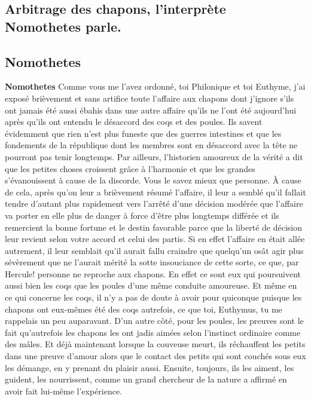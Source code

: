 \documentclass[12pt]{book}
\begin{document}
\begin{pages}
        \begin{Rightside}
        \beginnumbering
            \pstart\section*{Arbitrage des chapons, l'interprète Nomothetes parle.}\pend\pstart\subsection*{Nomothetes}\pend\pstart\textbf{Nomothetes}\hspace{1cm} 
                        Comme vous me l’avez ordonné, toi Philonique et toi Euthyme, j’ai exposé brièvement et sans artifice toute l’affaire aux chapons dont j’ignore s’ils ont jamais été aussi ébahis dans une autre affaire qu’ils ne l’ont été aujourd’hui après qu’ils ont entendu le désaccord des coqs et des poules.
                        Ils savent évidemment que rien n’est plus funeste que des guerres intestines et que les fondements de la république dont les membres sont en désaccord avec la tête ne pourront pas tenir longtemps. Par ailleurs, l’historien amoureux de la vérité a dit que les petites choses croissent grâce à l’harmonie et que les grandes s’évanouissent à cause de la discorde. Vous le savez mieux que personne. 
                        À cause de cela, après qu’on leur a brièvement résumé l’affaire, il leur a semblé qu’il fallait tendre d’autant plus rapidement vers l’arrêté d’une décision modérée que l’affaire va porter en elle plus de danger à force d’être plus longtemps différée et ils remercient la bonne fortune et le destin favorable parce que la liberté de décision leur revient selon votre accord et celui des partis. 
                        Si en effet l’affaire en était allée autrement, il leur semblait qu’il aurait fallu craindre que quelqu’un osât agir plus sévèrement que ne l’aurait mérité la sotte insouciance de cette sorte, ce que, par Hercule! personne ne reproche aux chapons.
                        En effet ce sont eux qui poursuivent aussi bien les coqs que les poules d’une même conduite amoureuse. Et même en ce qui concerne les coqs, il n’y a pas de doute à avoir pour quiconque puisque les chapons ont eux-mêmes été des coqs autrefois, ce que toi, Euthymus, tu me rappelais un peu auparavant. D’un autre côté, pour les poules, les preuves sont le fait qu’autrefois les chapons les ont jadis aimées selon l’instinct ordinaire comme des mâles.
                        Et déjà maintenant lorsque la couveuse meurt, ils réchauffent les petits dans une preuve d’amour alors que le contact des petits qui sont couchés sous eux les démange, en y prenant du plaisir aussi. Ensuite, toujours, ils les aiment, les guident, les nourrissent, comme un grand chercheur de la nature a affirmé en avoir fait lui-même l’expérience.

\end{Rightside}
\end{pages}
\end{document}
